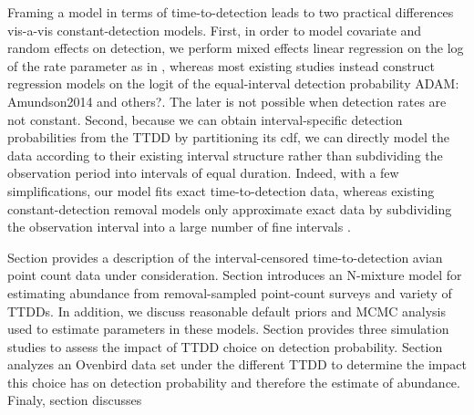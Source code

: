 \documentclass[useAMS,usenatbib,referee,12pt]{article}
\newcommand{\adam}[1]{{\color{blue} ADAM: #1}}
\begin{document}
Framing a model in terms of time-to-detection leads to two practical differences vis-a-vis constant-detection models.  
First, in order to model covariate and random effects on detection, we perform mixed effects linear regression on the log of the rate parameter as in \citet{Solymos2013}, whereas most existing studies instead construct regression models on the logit of the equal-interval detection probability \adam{Amundson2014 and others?}.  
The later is not possible when detection rates are not constant.  
Second, because we can obtain interval-specific detection probabilities from the TTDD by partitioning its cdf, we can directly model the data according to their existing interval structure rather than subdividing the observation period into intervals of equal duration.  
Indeed, with a few simplifications, our model fits exact time-to-detection data, whereas existing constant-detection removal models only approximate exact data by subdividing the observation interval into a large number of fine intervals \citep{Reidy2011, Amundson2014}.
% 

Section \label{sec:data} provides a description of the interval-censored time-to-detection avian point count data under consideration.
Section \label{sec:model} introduces an N-mixture model for estimating abundance from removal-sampled point-count surveys and variety of TTDDs. In addition, we discuss reasonable default priors and MCMC analysis used to estimate parameters in these models.
Section \label{sec:sim} provides three simulation studies to assess the impact of TTDD choice on detection probability. 
Section \label{sec:ovenbirds} analyzes an Ovenbird data set under the different TTDD to determine the impact this choice has on detection probability and therefore the estimate of abundance.
Finaly, section \label{sec:discuss} discusses 
\end{document}
